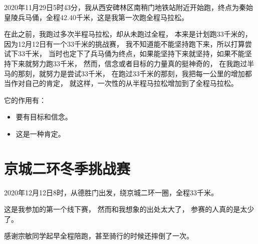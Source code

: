 2020年11月29日5时43分，我从西安碑林区南稍门地铁站附近开始跑，终点为秦始皇陵兵马俑，全程42.40千米，这是我第一次跑全程马拉松。

在此之前，我跑过多次半程马拉松，却从未跑过全程，
本来是计划跑33千米的，因为12月12日有一个33千米的挑战赛，
我不知道能不能坚持跑下来，所以打算尝试下33千米，
当时也定下了兵马俑为终点，如果能坚持下来就坚持，如果不能坚持下来就努力跑33千米，
然而，信念或者目标的力量真的挺神奇的，
在我跑过半马的那刻，就努力是尝试33千米，
在跑过33千米的那刻，我把每一公里的增加都当作对自己的肯定，
就这样，一次性的从半程马拉松增加到了全程马拉松。

它的作用有：
\begin{itemize}
\item 要有目标和信念。
\item 这是一种肯定。
\end{itemize}

\section{京城二环冬季挑战赛}

2020年12月12日8时，从德胜门出发，绕京城二环一圈，全程33千米。

这是我参加的第一个线下赛，
然而和我想象的出处太大了，
参赛的人真的是太少了。


感谢宗敏同学起早全程陪跑，甚至骑行的时候还摔倒了一次。





